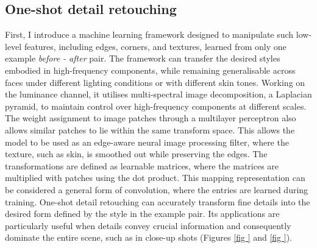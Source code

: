 \subsection{One-shot detail retouching}
First, I introduce a machine learning framework designed to manipulate such low-level features, including edges, corners, and textures, learned from only one example \textit{before - after} pair. The framework can transfer the desired styles embodied in high-frequency components, while remaining generalisable across faces under different lighting conditions or with different skin tones. Working on the luminance channel, it utilises multi-spectral image decomposition, a Laplacian pyramid, to maintain control over high-frequency components at different scales. The weight assignment to image patches through a multilayer perceptron also allows similar patches to lie within the same transform space. This allows the model to be used as an edge-aware neural image processing filter, where the texture, such as skin, is smoothed out while preserving the edges. The transformations are defined as learnable matrices, where the matrices are multiplied with patches using the dot product. This mapping representation can be considered a general form of convolution, where the entries are learned during training. One-shot detail retouching can accurately transform fine details into the desired form defined by the style in the example pair. Its applications are particularly useful when details convey crucial information and consequently dominate the entire scene, such as in close-up shots (Figures \ref{fig
} and \ref{fig
}).





